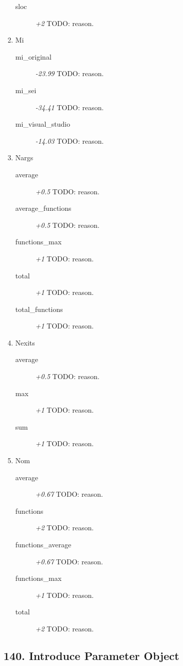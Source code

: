 \begin{enumerate}
\begin{description}
          \item [sloc] \textit{+2} TODO: reason.
        \end{description}
  \item Mi
        \begin{description}
          \item [mi\_original] \textit{-23.99} TODO: reason.
          \item [mi\_sei] \textit{-34.41} TODO: reason.
          \item [mi\_visual\_studio] \textit{-14.03} TODO: reason.
        \end{description}
  \item Nargs
        \begin{description}
          \item [average] \textit{+0.5} TODO: reason.
          \item [average\_functions] \textit{+0.5} TODO: reason.
          \item [functions\_max] \textit{+1} TODO: reason.
          \item [total] \textit{+1} TODO: reason.
          \item [total\_functions] \textit{+1} TODO: reason.
        \end{description}
  \item Nexits
        \begin{description}
          \item [average] \textit{+0.5} TODO: reason.
          \item [max] \textit{+1} TODO: reason.
          \item [sum] \textit{+1} TODO: reason.
        \end{description}
  \item Nom
        \begin{description}
          \item [average] \textit{+0.67} TODO: reason.
          \item [functions] \textit{+2} TODO: reason.
          \item [functions\_average] \textit{+0.67} TODO: reason.
          \item [functions\_max] \textit{+1} TODO: reason.
          \item [total] \textit{+2} TODO: reason.
        \end{description}
\end{enumerate}
\subsection{140. Introduce Parameter Object}

